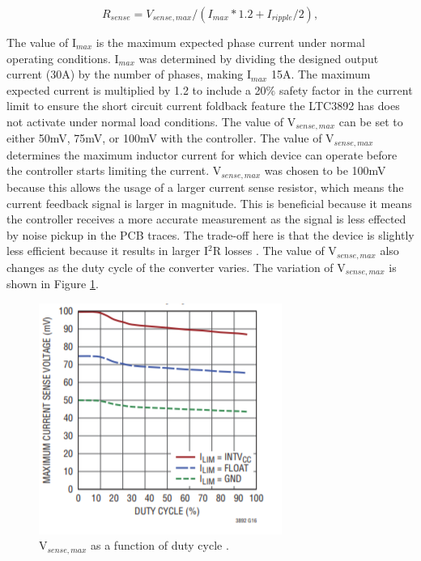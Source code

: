 \documentclass[11pt]{article}
\begin{document}
    \begin{equation}
        R_{sense}=V_{sense,max}/(I_{max}*1.2+I_{ripple}/2),
        \label{currentsense}
    \end{equation}

    \noindent The value of I$_{max}$ is the maximum expected phase current under normal operating conditions. I$_{max}$ was determined by dividing the designed output current (30A) by the number of phases, making I$_{max}$ 15A. The maximum expected current is multiplied by 1.2 to include a 20$\%$ safety factor in the current limit to ensure the short circuit current foldback feature the LTC3892 has does not activate under normal load conditions. 
    The value of V$_{sense,max}$ can be set to either 50mV, 75mV, or 100mV with the controller. The value of V$_{sense,max}$ determines the maximum inductor current for which device can operate before the controller starts limiting the current. V$_{sense,max}$ was chosen to be 100mV because this allows the usage of a larger current sense resistor, which means the current feedback signal is larger in magnitude. This is beneficial because it means the controller receives a more accurate measurement as the signal is less effected by noise pickup in the PCB traces. The trade-off here is that the device is slightly less efficient because it results in larger I$^2$R losses \cite{linear_technology_ltc3892:_nodate}.
    \newline
    \newline
    \noindent The value of V$_{sense,max}$ also changes as the duty cycle of the converter varies. The variation of V$_{sense,max}$ is shown in Figure \ref{sensemax}.
    
    \begin{figure}[H]
        \centering
        \includegraphics{vsense.PNG}
        \caption{V$_{sense,max}$ as a function of duty cycle
        \cite{linear_technology_ltc3892:_nodate}.}
        \label{sensemax}
    \end{figure}
    
\end{document}
